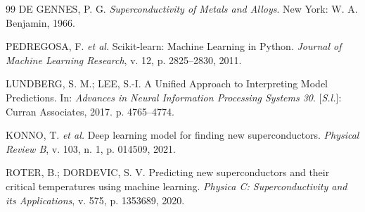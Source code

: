 \documentclass[12pt, a4paper, oneside]{report}
\begin{document}
\begin{thebibliography}{99}
 DE GENNES, P. G. \textit{Superconductivity of Metals and Alloys}. New York: W. A. Benjamin, 1966.

 PEDREGOSA, F. \textit{et al.} Scikit-learn: Machine Learning in Python. \textit{Journal of Machine Learning Research}, v. 12, p. 2825--2830, 2011.

 LUNDBERG, S. M.; LEE, S.-I. A Unified Approach to Interpreting Model Predictions. In: \textit{Advances in Neural Information Processing Systems 30}. [\textit{S.l.}]: Curran Associates, 2017. p. 4765--4774.

 KONNO, T. \textit{et al.} Deep learning model for finding new superconductors. \textit{Physical Review B}, v. 103, n. 1, p. 014509, 2021.

 ROTER, B.; DORDEVIC, S. V. Predicting new superconductors and their critical temperatures using machine learning. \textit{Physica C: Superconductivity and its Applications}, v. 575, p. 1353689, 2020.
\end{thebibliography}
\end{document}
